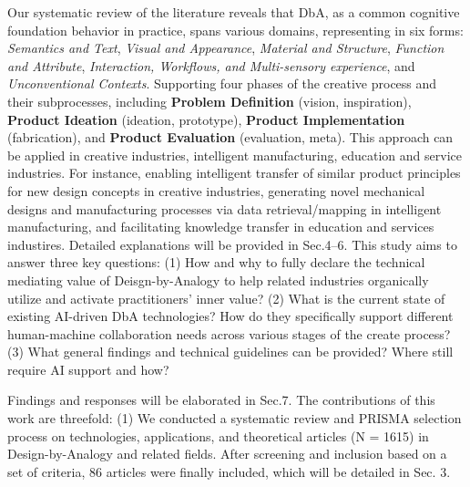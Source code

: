 Our systematic review of the literature reveals that DbA, as a common cognitive foundation behavior in practice, spans various domains, representing in six forms: \textit{Semantics and Text}, \textit{Visual and Appearance}, \textit{Material and Structure}, \textit{ Function and Attribute}, \textit{Interaction, Workflows, and Multi-sensory experience}, and \textit{Unconventional Contexts}. Supporting four phases of the creative process and their subprocesses, including \textbf{Problem Definition} (vision, inspiration), \textbf{Product Ideation} (ideation, prototype), \textbf{Product Implementation} (fabrication), and \textbf{Product Evaluation} (evaluation, meta). This approach can be applied in creative industries, intelligent manufacturing, education and service industries. For instance, enabling intelligent transfer of similar product principles for new design concepts in creative industries, generating novel mechanical designs and manufacturing processes via data retrieval/mapping in intelligent manufacturing, and facilitating knowledge transfer in education and services industires. Detailed explanations will be provided in Sec.4–6. This study aims to answer three key questions: 
(1) How and why to fully declare the technical mediating value of Deisgn-by-Analogy to help related industries organically utilize and activate practitioners' inner value? 
(2) What is the current state of existing AI-driven DbA technologies? How do they specifically support different human-machine collaboration needs across various stages of the create process?
(3) What general findings and technical guidelines can be provided? Where still require AI support and how?

Findings and responses will be elaborated in Sec.7.
The contributions of this work are threefold: 
(1) We conducted a systematic review and PRISMA selection process\cite{page2021prisma} on technologies, applications, and theoretical articles (N = 1615) in Design-by-Analogy and related fields. After screening and inclusion based on a set of criteria, 86 articles were finally included, which will be detailed in Sec. 3.  


